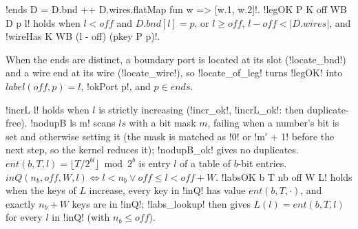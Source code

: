 {\begin{definition}\label{def:boxes-legOK}
\lbx!ends D = D.bnd ++ D.wires.flatMap fun w => [w.1, w.2]!. \lbx!legOK P K off WB D p l! holds when $l<\mathit{off}$ and $D.\mathit{bnd}[l]=p$, or $l\ge\mathit{off}$, $l-\mathit{off}<|D.\mathit{wires}|$, and \lbx!wireHas K WB (l - off) (pkey P p)!.
\end{definition}
When the ends are distinct, a boundary port is located at its slot (\lbx!locate_bnd!) and a wire end at its wire (\lbx!locate_wire!), so \lbx!locate_of_leg! turns \lbx!legOK! into $\mathit{label}(\mathit{off},p)=l$, \lbx!okPort p!, and $p\in\mathit{ends}$.

\begin{definition}\label{def:boxes-incr}
\lbx!incrL l! holds when $l$ is strictly increasing (\lbx!incr_ok!, \lbx!incrL_ok!: then duplicate-free). \lbx!nodupB ls m! scans $ls$ with a bit mask $m$, failing when a number's bit is set and otherwise setting it (the mask is matched as \lbx!0! or \lbx!m′ + 1! before the next step, so the kernel reduces it); \lbx!nodupB_ok! gives no duplicates. $\mathit{ent}(b,T,l)=\lfloor T/2^{bl}\rfloor\bmod 2^b$ is entry $l$ of a table of $b$-bit entries. $\mathit{inQ}(n_b,\mathit{off},W,l)\iff l<n_b\vee\mathit{off}\le l<\mathit{off}+W$. \lbx!labsOK b T nb off W L! holds when the keys of $L$ increase, every key in \lbx!inQ! has value $\mathit{ent}(b,T,\cdot)$, and exactly $n_b+W$ keys are in \lbx!inQ!; \lbx!labs_lookup! then gives $L(l)=\mathit{ent}(b,T,l)$ for every $l$ in \lbx!inQ! (with $n_b\le\mathit{off}$).
\end{definition}

}
